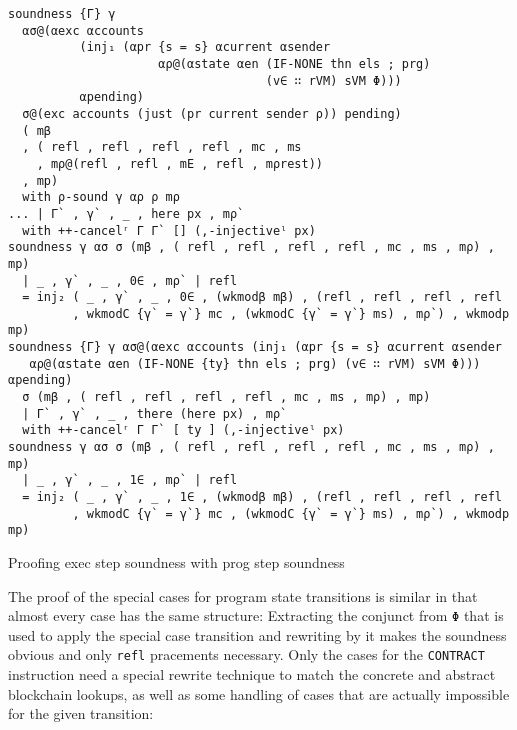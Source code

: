 \begin{listing}[!ht]
\begin{verbatim}
soundness {Γ} γ 
  ασ@(αexc αccounts 
          (inj₁ (αpr {s = s} αcurrent αsender
                     αρ@(αstate αen (IF-NONE thn els ; prg) 
                                    (v∈ ∷ rVM) sVM Φ)))
          αpending)
  σ@(exc accounts (just (pr current sender ρ)) pending)
  ( mβ
  , ( refl , refl , refl , refl , mc , ms
    , mρ@(refl , refl , mE , refl , mρrest))
  , mp)
  with ρ-sound γ αρ ρ mρ
... | Γ` , γ` , _ , here px , mρ`
  with ++-cancelʳ Γ Γ` [] (,-injectiveˡ px)
soundness γ ασ σ (mβ , ( refl , refl , refl , refl , mc , ms , mρ) , mp)
  | _ , γ` , _ , 0∈ , mρ` | refl
  = inj₂ ( _ , γ` , _ , 0∈ , (wkmodβ mβ) , (refl , refl , refl , refl
         , wkmodC {γ` = γ`} mc , (wkmodC {γ` = γ`} ms) , mρ`) , wkmodp mp)
soundness {Γ} γ ασ@(αexc αccounts (inj₁ (αpr {s = s} αcurrent αsender
   αρ@(αstate αen (IF-NONE {ty} thn els ; prg) (v∈ ∷ rVM) sVM Φ))) αpending)
  σ (mβ , ( refl , refl , refl , refl , mc , ms , mρ) , mp)
  | Γ` , γ` , _ , there (here px) , mρ`
  with ++-cancelʳ Γ Γ` [ ty ] (,-injectiveˡ px)
soundness γ ασ σ (mβ , ( refl , refl , refl , refl , mc , ms , mρ) , mp)
  | _ , γ` , _ , 1∈ , mρ` | refl
  = inj₂ ( _ , γ` , _ , 1∈ , (wkmodβ mβ) , (refl , refl , refl , refl
         , wkmodC {γ` = γ`} mc , (wkmodC {γ` = γ`} ms) , mρ`) , wkmodp mp)
\end{verbatim}
\caption{Proofing exec step soundness with prog step soundness}
\label{exec2progstep-soundness}
\end{listing}

The proof of the special cases for program state transitions is similar in that
almost every case has the same structure:
Extracting the conjunct from \verb/Φ/ that is used to apply the special case transition
and rewriting by it makes the soundness obvious and only \verb/refl/ pracements necessary.
Only the cases for the \verb/CONTRACT/ instruction need a special rewrite technique
to match the concrete and abstract blockchain lookups,
as well as some handling of cases that are actually impossible for the given transition:

